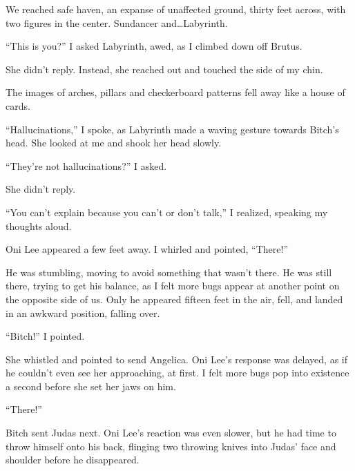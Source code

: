We reached safe haven, an expanse of unaffected ground, thirty feet across, with two figures in the center.  Sundancer and\ldots Labyrinth.



``This is you?'' I asked Labyrinth, awed, as I climbed down off Brutus.



She didn't reply.  Instead, she reached out and touched the side of my chin.



The images of arches, pillars and checkerboard patterns fell away like a house of cards.



``Hallucinations,'' I spoke, as Labyrinth made a waving gesture towards Bitch's head.  She looked at me and shook her head slowly.



``They're not hallucinations?'' I asked.



She didn't reply.



``You can't explain because you can't or don't talk,'' I realized, speaking my thoughts aloud.



Oni Lee appeared a few feet away.  I whirled and pointed, ``There!''



He was stumbling, moving to avoid something that wasn't there.  He was still there, trying to get his balance, as I felt more bugs appear at another point on the opposite side of us.  Only he appeared fifteen feet in the air, fell, and landed in an awkward position, falling over.



``Bitch!'' I pointed.



She whistled and pointed to send Angelica.  Oni Lee's response was delayed, as if he couldn't even see her approaching, at first.  I felt more bugs pop into existence a second before she set her jaws on him.



``There!''



Bitch sent Judas next.  Oni Lee's reaction was even slower, but he had time to throw himself onto his back, flinging two throwing knives into Judas' face and shoulder before he disappeared.




